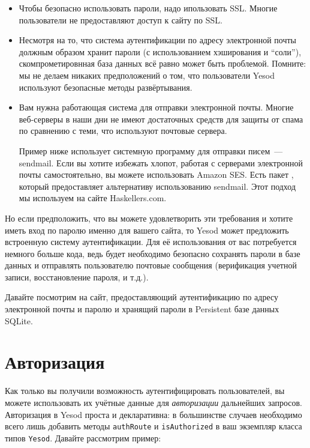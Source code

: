 \begin{itemize}
    \item Чтобы безопасно использовать пароли, надо ипользовать SSL. Многие пользователи не предоставляют доступ к сайту по SSL.

    \item Несмотря на то, что система аутентификации по адресу электронной почты должным образом хранит пароли (с использованием хэширования и ``соли''), скомпрометировнная база данных всё равно может быть проблемой. Помните: мы не делаем никаких предположений о том, что пользователи Yesod используют безопасные методы развёртывания.

    \item Вам нужна работающая система для отправки электронной почты. Многие веб-серверы в наши дни не имеют достаточных средств для защиты от спама по сравнению с теми, что используют почтовые сервера.

    \begin{remark}
    Пример ниже использует системную программу для отправки писем~--- sendmail. Если вы хотите избежать хлопот, работая с серверами электронной почты самостоятельно, вы можете использовать Amazon SES. Есть пакет , который предоставляет альтернативу использованию sendmail. Этот подход мы используем на сайте Haskellers.com.
    \end{remark}
\end{itemize}

Но если предположить, что вы можете удовлетворить эти требования и хотите иметь вход по паролю именно для вашего сайта, то Yesod может предложить встроенную систему аутентификации. Для её использования от вас потребуется немного больше кода, ведь будет необходимо безопасно сохранять пароли в базе данных и отправлять пользователю почтовые сообщения (верификация учетной записи, восстановление пароля, и т.д.).

Давайте посмотрим на сайт, предоставляющий аутентификацию по адресу электронной почты и паролю и хранящий пароли в Persistent базе данных SQLite.


\section{Авторизация}

Как только вы получили возможность аутентифицировать пользователей, вы можете использовать их учётные данные для \emph{авторизации} дальнейших запросов. Авторизация в Yesod проста и декларативна: в большинстве случаев необходимо всего лишь добавить методы \lstinline'authRoute' и \lstinline'isAuthorized' в ваш экземпляр класса типов \lstinline'Yesod'. Давайте рассмотрим пример:

